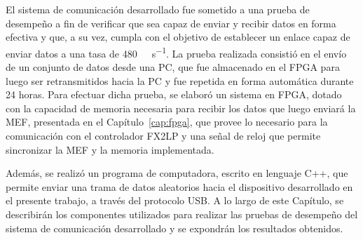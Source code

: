 

El sistema de comunicación desarrollado fue sometido a una prueba de desempeño a fin de verificar que sea capaz de enviar y recibir datos en forma efectiva y que, a su vez, cumpla con el objetivo de establecer un enlace capaz de enviar datos a una tasa de \SI{480}{\mega\bit\per\second}. La prueba realizada consistió en el envío de un conjunto de datos desde una PC, que fue almacenado en el FPGA para luego ser retransmitidos hacia la PC y fue repetida en forma automática durante 24 horas. Para efectuar dicha prueba, se elaboró un sistema en FPGA, dotado con la capacidad de memoria necesaria para recibir los datos que luego enviará la MEF, presentada en el Capítulo~\ref{cap:fpga}, que provee lo necesario para la comunicación con el controlador FX2LP y una señal de reloj que permite sincronizar la MEF y la memoria implementada.

Además, se realizó un programa de computadora, escrito en lenguaje C++, que permite enviar una trama de datos aleatorios hacia el dispositivo desarrollado en el presente trabajo, a través del protocolo USB. A lo largo de este Capítulo, se describirán los componentes utilizados para realizar las pruebas de desempeño del sistema de comunicación desarrollado y se expondrán los resultados obtenidos.